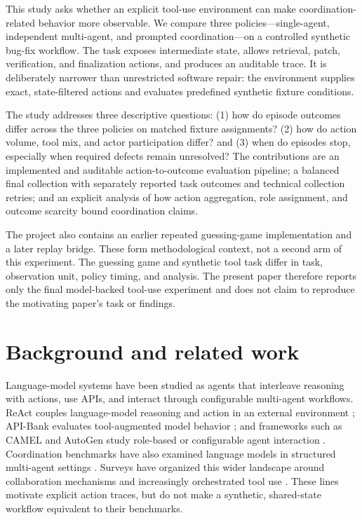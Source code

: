 \documentclass[pdflatex,sn-basic,Numbered]{sn-jnl}
\begin{document}
This study asks whether an explicit tool-use environment can make coordination-related behavior more observable. We compare three policies---single-agent, independent multi-agent, and prompted coordination---on a controlled synthetic bug-fix workflow. The task exposes intermediate state, allows retrieval, patch, verification, and finalization actions, and produces an auditable trace. It is deliberately narrower than unrestricted software repair: the environment supplies exact, state-filtered actions and evaluates predefined synthetic fixture conditions.

The study addresses three descriptive questions: (1) how do episode outcomes differ across the three policies on matched fixture assignments? (2) how do action volume, tool mix, and actor participation differ? and (3) when do episodes stop, especially when required defects remain unresolved? The contributions are an implemented and auditable action-to-outcome evaluation pipeline; a balanced final collection with separately reported task outcomes and technical collection retries; and an explicit analysis of how action aggregation, role assignment, and outcome scarcity bound coordination claims.

The project also contains an earlier repeated guessing-game implementation and a later replay bridge. These form methodological context, not a second arm of this experiment. The guessing game and synthetic tool task differ in task, observation unit, policy timing, and analysis. The present paper therefore reports only the final model-backed tool-use experiment and does not claim to reproduce the motivating paper's task or findings.

\section{Background and related work}

Language-model systems have been studied as agents that interleave reasoning with actions, use APIs, and interact through configurable multi-agent workflows. ReAct couples language-model reasoning and action in an external environment \cite{Yao}; API-Bank evaluates tool-augmented model behavior \cite{LiAPI}; and frameworks such as CAMEL and AutoGen study role-based or configurable agent interaction \cite{LiCAMEL,Wu}. Coordination benchmarks have also examined language models in structured multi-agent settings \cite{Agashe}. Surveys have organized this wider landscape around collaboration mechanisms and increasingly orchestrated tool use \cite{Tran}. These lines motivate explicit action traces, but do not make a synthetic, shared-state workflow equivalent to their benchmarks.
\end{document}
